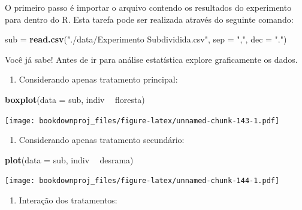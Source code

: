\documentclass[
]{article}
\newenvironment{Shaded}{\begin{snugshade}}{\end{snugshade}}
\newcommand{\DataTypeTok}[1]{\textcolor[rgb]{0.13,0.29,0.53}{#1}}
\newcommand{\KeywordTok}[1]{\textcolor[rgb]{0.13,0.29,0.53}{\textbf{#1}}}
\newcommand{\NormalTok}[1]{#1}
\newcommand{\OperatorTok}[1]{\textcolor[rgb]{0.81,0.36,0.00}{\textbf{#1}}}
\newcommand{\StringTok}[1]{\textcolor[rgb]{0.31,0.60,0.02}{#1}}
\providecommand{\tightlist}{%
  \setlength{\itemsep}{0pt}\setlength{\parskip}{0pt}}
\begin{document}
O primeiro passo é importar o arquivo contendo os resultados do experimento para dentro do R. Esta tarefa pode ser realizada através do seguinte comando:

\begin{Shaded}
\begin{Highlighting}[]
\NormalTok{sub =}\StringTok{ }\KeywordTok{read.csv}\NormalTok{(}\StringTok{"./data/Experimento Subdividida.csv"}\NormalTok{, }
               \DataTypeTok{sep =} \StringTok{","}\NormalTok{, }\DataTypeTok{dec =} \StringTok{"."}\NormalTok{)}
\end{Highlighting}
\end{Shaded}

Você já sabe! Antes de ir para análise estatística explore graficamente os dados.

\begin{enumerate}
\def\labelenumi{\arabic{enumi}.}
\tightlist
\item
  Considerando apenas tratamento principal:
\end{enumerate}

\begin{Shaded}
\begin{Highlighting}[]
\KeywordTok{boxplot}\NormalTok{(}\DataTypeTok{data =}\NormalTok{ sub, indiv }\OperatorTok{~}\StringTok{ }\NormalTok{floresta)}
\end{Highlighting}
\end{Shaded}

\texttt{[image: bookdownproj\_files/figure-latex/unnamed-chunk-143-1.pdf]}

\begin{enumerate}
\def\labelenumi{\arabic{enumi}.}
\setcounter{enumi}{1}
\tightlist
\item
  Considerando apenas tratamento secundário:
\end{enumerate}

\begin{Shaded}
\begin{Highlighting}[]
\KeywordTok{plot}\NormalTok{(}\DataTypeTok{data =}\NormalTok{ sub, indiv }\OperatorTok{~}\StringTok{ }\NormalTok{desrama)}
\end{Highlighting}
\end{Shaded}

\texttt{[image: bookdownproj\_files/figure-latex/unnamed-chunk-144-1.pdf]}

\begin{enumerate}
\def\labelenumi{\arabic{enumi}.}
\setcounter{enumi}{2}
\tightlist
\item
  Interação dos tratamentos:
\end{enumerate}
\end{document}
